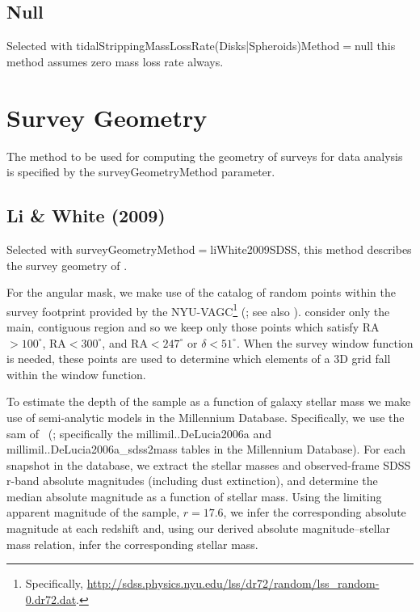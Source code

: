 \subsection{Null}

Selected with {\normalfont \ttfamily tidalStrippingMassLossRate(Disks|Spheroids)Method}$=${\normalfont \ttfamily null} this method assumes zero mass loss rate always.

\section{Survey Geometry}\label{phys:surveyGeometry}

The method to be used for computing the geometry of surveys for data analysis is specified by the {\normalfont \ttfamily surveyGeometryMethod} parameter.

\subsection{Li \& White (2009)}\label{phys:surveyGeometry:surveyGeometryLiWhite2009SDSS}

Selected with {\normalfont \ttfamily surveyGeometryMethod}$=${\normalfont \ttfamily liWhite2009SDSS}, this method describes the survey geometry of \cite{li_distribution_2009}. 

For the angular mask, we make use of the catalog of random points within the survey footprint provided by the NYU-VAGC\footnote{Specifically, \href{http://sdss.physics.nyu.edu/lss/dr72/random/lss_random-0.dr72.dat}{http://sdss.physics.nyu.edu/lss/dr72/random/lss\_random-0.dr72.dat}.} (\citealt{blanton_new_2005}; see also \citealt{adelman-mccarthy_sixth_2008,padmanabhan_improved_2008}). \cite{li_distribution_2009} consider only the main, contiguous region and so we keep only those points which satisfy RA$>100^\circ$, RA$<300^\circ$, and RA$<247^\circ$ or $\delta< 51^\circ$. When the survey window function is needed, these points are used to determine which elements of a 3D grid fall within the window function.

To estimate the depth of the \cite{li_distribution_2009} sample as a function of galaxy stellar mass we make use of semi-analytic models in the Millennium Database. Specifically, we use the \gls{sam} of \citeauthor{de_lucia_hierarchical_2007}~(\citeyear{de_lucia_hierarchical_2007}; specifically the {\normalfont \ttfamily millimil..DeLucia2006a} and {\normalfont \ttfamily millimil..DeLucia2006a\_sdss2mass} tables in the Millennium Database). For each snapshot in the database, we extract the stellar masses and observed-frame SDSS r-band absolute magnitudes (including dust extinction), and determine the median absolute magnitude as a function of stellar mass. Using the limiting apparent magnitude of the \cite{li_distribution_2009} sample, $r=17.6$, we infer the corresponding absolute magnitude at each redshift and, using our derived absolute magnitude--stellar mass relation, infer the corresponding stellar mass.

